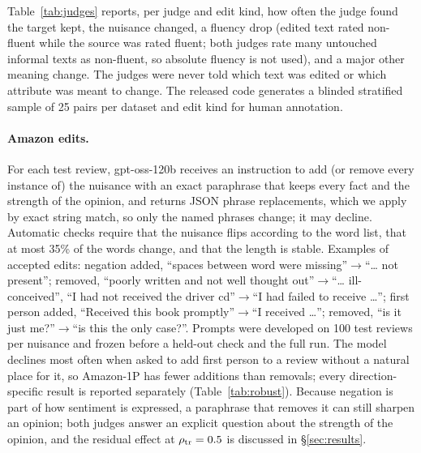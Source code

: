 Table~\ref{tab:judges} reports, per judge and edit kind, how often the judge found the target kept, the nuisance changed, a fluency drop (edited text rated non-fluent while the source was rated fluent; both judges rate many untouched informal texts as non-fluent, so absolute fluency is not used), and a major other meaning change. The judges were never told which text was edited or which attribute was meant to change. The released code generates a blinded stratified sample of 25 pairs per dataset and edit kind for human annotation.

\paragraph{Amazon edits.} For each test review, gpt-oss-120b receives an instruction to add (or remove every instance of) the nuisance with an exact paraphrase that keeps every fact and the strength of the opinion, and returns JSON phrase replacements, which we apply by exact string match, so only the named phrases change; it may decline. Automatic checks require that the nuisance flips according to the word list, that at most 35\% of the words change, and that the length is stable. Examples of accepted edits: negation added, ``spaces between word were missing''$\to$``\dots{} not present''; removed, ``poorly written and not well thought out''$\to$``\dots{} ill-conceived'', ``I had not received the driver cd''$\to$``I had failed to receive \dots''; first person added, ``Received this book promptly''$\to$``I received \dots''; removed, ``is it just me?''$\to$``is this the only case?''. Prompts were developed on 100 test reviews per nuisance and frozen before a held-out check and the full run. The model declines most often when asked to add first person to a review without a natural place for it, so Amazon-1P has fewer additions than removals; every direction-specific result is reported separately (Table~\ref{tab:robust}). Because negation is part of how sentiment is expressed, a paraphrase that removes it can still sharpen an opinion; both judges answer an explicit question about the strength of the opinion, and the residual effect at $\rho_{\text{tr}}=0.5$ is discussed in \S\ref{sec:results}.

